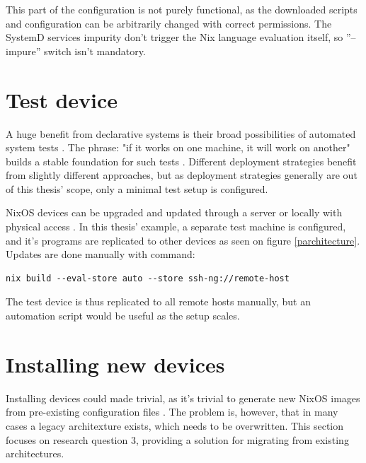 This part of the configuration is not purely functional, as the
downloaded scripts and configuration can be arbitrarily changed with
correct permissions. The SystemD services impurity don't trigger the
Nix language evaluation itself, so ''--impure'' switch isn't
mandatory.

\section{Test device}

A huge benefit from declarative systems is their broad possibilities
of automated system tests \cite{van2010automating}. The phrase: "if it
works on one machine, it will work on another" builds a stable
foundation for such tests \cite{nixosNixOSManual}. Different
deployment strategies benefit from slightly different approaches, but
as deployment strategies generally are out of this thesis' scope, only
a minimal test setup is configured.

NixOS devices can be upgraded and updated through a server or locally
with physical access \cite{nixosNixOSManual}. In this thesis' example,
a separate test machine is configured, and it's programs are
replicated to other devices as seen on figure
\ref{parchitecture}. Updates are done manually with command:

\begin{lstlisting}
nix build --eval-store auto --store ssh-ng://remote-host
\end{lstlisting}

The test device is thus replicated to all remote hosts manually, but
an automation script would be useful as the setup scales.

\section{Installing new devices} \label{instnewdevices}

Installing devices could made trivial, as it's trivial to generate new
NixOS images from pre-existing configuration files
\cite{nixosNixOSManual}. The problem is, however, that in many cases a
legacy architexture exists, which needs to be overwritten. This
section focuses on research question 3, providing a solution for
migrating from existing architectures.

